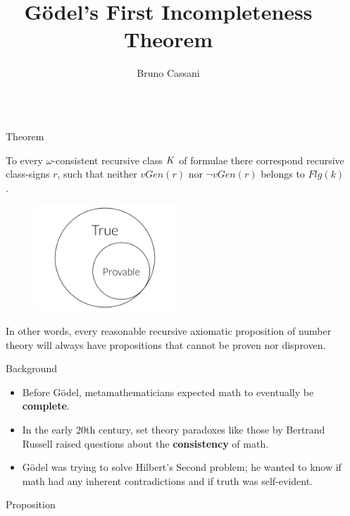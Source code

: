 \documentclass[final]{beamer}
\title{Gödel's First Incompleteness Theorem}
\author{Bruno Cassani}
\institute[shortinst]{\textbf{Morrissey College of Arts and Sciences}, Boston College}
\newlength{\sepwidth}
\newlength{\colwidth}
\newcommand{\separatorcolumn}{\begin{column}{\sepwidth}\end{column}}
\begin{document}
\begin{frame}[t]
\begin{columns}[t]
\separatorcolumn

\begin{column}{\colwidth}


  \begin{alertblock}{Theorem}

    To every $\omega$-consistent recursive class $\small{K}$ of formulae there correspond recursive class-signs $r$, such that neither $vGen(r)$ nor $\neg vGen(r)$ belongs to $Flg(k)$.

    \begin{figure}
      \centering
            \includegraphics[width=0.5\textwidth]{figures/Draw_1.png}
    \end{figure}

    In other words, every reasonable recursive axiomatic proposition of number theory will always have propositions that cannot be proven nor disproven.
    
  \end{alertblock}

  
\begin{block}{Background}

    \begin{itemize}
      \item Before Gödel, metamathematicians expected math to eventually be \textbf{complete}.
      \item In the early 20th century, set theory paradoxes like those by Bertrand Russell raised questions about the \textbf{consistency} of math.
      \item Gödel was trying to solve Hilbert's Second problem; he wanted to know if math had any inherent contradictions and if truth was self-evident.
        
    \end{itemize}

\end{block}


\begin{exampleblock}{Proposition}


\end{exampleblock}
\end{column}
\end{columns}
\end{frame}
\end{document}
